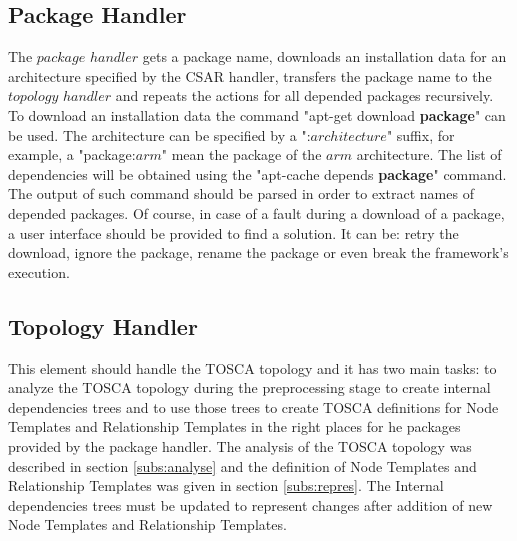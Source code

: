 \subsection{Package Handler} \label{subs:archph}
The $package$ $handler$ gets a package name, downloads an installation data for an architecture specified by the CSAR handler, transfers the package name to the $topology$ $handler$ and repeats the actions for all depended packages recursively. 
To download an installation data the command "apt-get download \textbf{package}" can be used. 
The architecture can be specified by a ":$architecture$" suffix, for example, a "package:$arm$" mean the package of the $arm$ architecture.
The list of dependencies will be obtained using the "apt-cache depends \textbf{package}" command. 
The output of such command should be parsed in order to extract names of depended packages.
Of course, in case of a fault during a download of a package, a user interface should be provided to find a solution.
It can be: retry the download, ignore the package, rename the package or even break the framework's execution.

\subsection{Topology Handler} \label{subs:archtop}
This element should handle the TOSCA topology and it has two main tasks: to analyze the TOSCA topology during the preprocessing stage to create internal dependencies trees and to use those trees to create TOSCA definitions for Node Templates and Relationship Templates in the right places for he packages provided by the package handler.
The analysis of the TOSCA topology was described in section \ref{subs:analyse} and the definition of Node Templates and Relationship Templates was given in section \ref{subs:repres}.
The Internal dependencies trees must be updated to represent changes after addition of new Node Templates and Relationship Templates.
